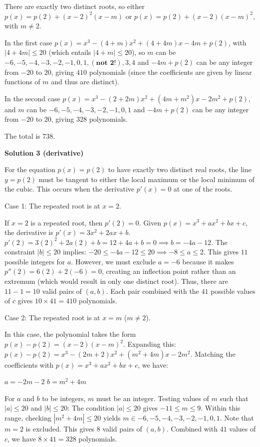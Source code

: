 \begin{enumerate}
{{ There are exactly two distinct roots, so either $p(x)=p(2)+(x-2)^2(x-m)$ or $p(x)=p(2)+(x-2)(x-m)^2$, with $m\neq 2$.

 In the first case $p(x)=x^3-(4+m)x^2+(4+4m)x-4m+p(2)$, with $|4+4m|\leq 20$ (which entails $|4+m|\leq 20$), so $m$ can be $-6,-5,-4,-3,-2,-1,0,1, (\textbf{not 2}!), 3,4$ and $-4m+p(2)$ can be any integer from $-20$ to $20$, giving $410$ polynomials (since the coefficients are given by linear functions of $m$ and thus are distinct). 

 In the second case $p(x)=x^3-(2+2m)x^2+(4m+m^2)x-2m^2+p(2)$, and $m$ can be $-6,-5,-4,-3,-2,-1,0,1$ and $-4m+p(2)$ can be any integer from $-20$ to $20$, giving $328$ polynomials.

 The total is $\boxed{738}$.

 



\textbf{Solution 3 (derivative)}

For the equation $p(x) = p(2)$ to have exactly two distinct real roots, the line $y = p(2)$ must be tangent to either the local maximum or the local minimum of the cubic. This occurs when the derivative $p'(x) = 0$ at one of the roots.

 Case 1: The repeated root is at $x=2$.

 If $x=2$ is a repeated root, then $p'(2) = 0$. Given $p(x) = x^3 + ax^2 + bx + c$, the derivative is $p'(x) = 3x^2 + 2ax + b$. $p'(2) = 3(2)^2 + 2a(2) + b = 12 + 4a + b = 0 \implies b = -4a - 12.$ The constraint $|b| \le 20$ implies: $-20 \le -4a - 12 \le 20 \implies -8 \le a \le 2.$ This gives $11$ possible integers for $a$. However, we must exclude $a = -6$ because it makes $p''(2) = 6(2) + 2(-6) = 0$, creating an inflection point rather than an extremum (which would result in only one distinct root). Thus, there are $11 - 1 = 10$ valid pairs of $(a, b)$. Each pair combined with the $41$ possible values of $c$ gives $10 \times 41 = 410$ polynomials.

 Case 2: The repeated root is at $x=m$ ($m \neq 2$).

 In this case, the polynomial takes the form $p(x) - p(2) = (x-2)(x-m)^2$. Expanding this: $p(x) - p(2) = x^3 - (2m+2)x^2 + (m^2+4m)x - 2m^2.$ Matching the coefficients with $p(x) = x^3 + ax^2 + bx + c$, we have:

 $a = -2m - 2$
$b = m^2 + 4m$

 For $a$ and $b$ to be integers, $m$ must be an integer. Testing values of $m$ such that $|a| \le 20$ and $|b| \le 20$: The condition $|a| \le 20$ gives $-11 \le m \le 9$. Within this range, checking $|m^2 + 4m| \le 20$ yields $m \in {-6, -5, -4, -3, -2, -1, 0, 1}$. Note that $m=2$ is excluded. This gives $8$ valid pairs of $(a, b)$. Combined with $41$ values of $c$, we have $8 \times 41 = 328$ polynomials.

}}
\end{enumerate}
